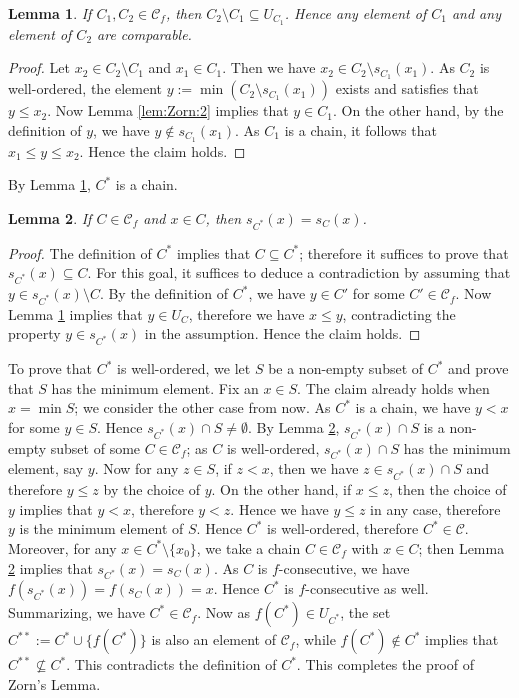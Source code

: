 \documentclass{article}
\newtheorem{lemma}{Lemma}
\begin{document}
\begin{lemma}
    \label{lem:Zorn:3}
    If $C_1,C_2 \in \mathcal{C}_f$, then $C_2 \setminus C_1 \subseteq U_{C_1}$.
    Hence any element of $C_1$ and any element of $C_2$ are comparable.
\end{lemma}
\begin{proof}
    Let $x_2 \in C_2 \setminus C_1$ and $x_1 \in C_1$.
    Then we have $x_2 \in C_2 \setminus s_{C_1}(x_1)$.
    As $C_2$ is well-ordered, the element $y := \min(C_2 \setminus s_{C_1}(x_1))$ exists and satisfies that $y \leq x_2$.
    Now Lemma \ref{lem:Zorn:2} implies that $y \in C_1$.
    On the other hand, by the definition of $y$, we have $y \not\in s_{C_1}(x_1)$.
    As $C_1$ is a chain, it follows that $x_1 \leq y \leq x_2$.
    Hence the claim holds.
\end{proof}

By Lemma \ref{lem:Zorn:3}, $C^*$ is a chain.

\begin{lemma}
    \label{lem:Zorn:5}
    If $C \in \mathcal{C}_f$ and $x \in C$, then $s_{C^*}(x) = s_C(x)$.
\end{lemma}
\begin{proof}
    The definition of $C^*$ implies that $C \subseteq C^*$; therefore it suffices to prove that $s_{C^*}(x) \subseteq C$.
    For this goal, it suffices to deduce a contradiction by assuming that $y \in s_{C^*}(x) \setminus C$.
    By the definition of $C^*$, we have $y \in C'$ for some $C' \in \mathcal{C}_f$.
    Now Lemma \ref{lem:Zorn:3} implies that $y \in U_C$, therefore we have $x \leq y$, contradicting the property $y \in s_{C^*}(x)$ in the assumption.
    Hence the claim holds.
\end{proof}

To prove that $C^*$ is well-ordered, we let $S$ be a non-empty subset of $C^*$ and prove that $S$ has the minimum element.
Fix an $x \in S$.
The claim already holds when $x = \min S$; we consider the other case from now.
As $C^*$ is a chain, we have $y < x$ for some $y \in S$.
Hence $s_{C^*}(x) \cap S \neq \emptyset$.
By Lemma \ref{lem:Zorn:5}, $s_{C^*}(x) \cap S$ is a non-empty subset of some $C \in \mathcal{C}_f$; as $C$ is well-ordered, $s_{C^*}(x) \cap S$ has the minimum element, say $y$.
Now for any $z \in S$, if $z < x$, then we have $z \in s_{C^*}(x) \cap S$ and therefore $y \leq z$ by the choice of $y$.
On the other hand, if $x \leq z$, then the choice of $y$ implies that $y < x$, therefore $y < z$.
Hence we have $y \leq z$ in any case, therefore $y$ is the minimum element of $S$.
Hence $C^*$ is well-ordered, therefore $C^* \in \mathcal{C}$.
Moreover, for any $x \in C^* \setminus \{x_0\}$, we take a chain $C \in \mathcal{C}_f$ with $x \in C$; then Lemma \ref{lem:Zorn:5} implies that $s_{C^*}(x) = s_C(x)$.
As $C$ is $f$-consecutive, we have $f(s_{C^*}(x)) = f(s_C(x)) = x$.
Hence $C^*$ is $f$-consecutive as well.
Summarizing, we have $C^* \in \mathcal{C}_f$.
Now as $f(C^*) \in U_{C^*}$, the set $C^{**} := C^* \cup \{f(C^*)\}$ is also an element of $\mathcal{C}_f$, while $f(C^*) \not\in C^*$ implies that $C^{**} \not\subseteq C^*$.
This contradicts the definition of $C^*$.
This completes the proof of Zorn's Lemma.
\end{document}
